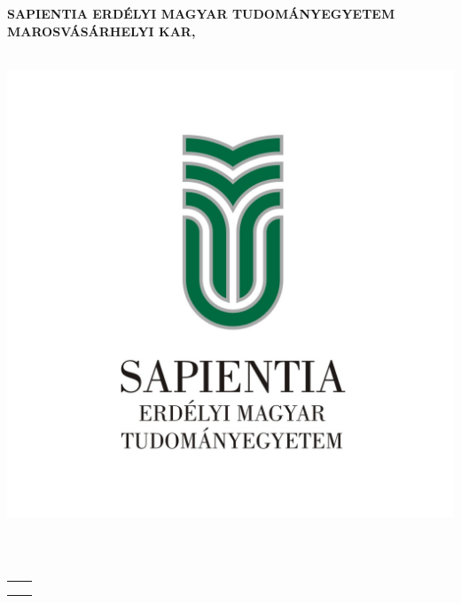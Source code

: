\begin{titlepage}
	\begin{center}
	
		\large{\bfseries SAPIENTIA ERDÉLYI MAGYAR TUDOMÁNYEGYETEM} \\
		\large{\bfseries MAROSVÁSÁRHELYI KAR,} \\
		\large{\bfseries \szakHU} \\[2.5cm]
			\begin{center}
			\includegraphics[scale=2]{images/sapientia-hu}
		\end{center}
		\vspace{0.4cm}
		\Large{\Large  \cimHu}\\[0.8cm]
		\vspace{0.2cm}
		\textsc{\Large \bfseries \dolgozattipusHU}\\[2.5cm]
		
		{
			\large
		
			\renewcommand{\arraystretch}{0.85}
			\begin{tabular}{cc}
				 \makebox[6.5cm]{Témavezető:} & \makebox[6.5cm]{Végzős hallgató:} \\ \noalign{\smallskip}
				 \makebox[6.5cm]{\temavezetoA,} & \makebox[6.5cm]{\szerzo} \\ {\temavezetoAfokozat}
			\end{tabular}
		}
		
		\vfill
		{\large \bfseries \ev}
	\end{center}
\end{titlepage}